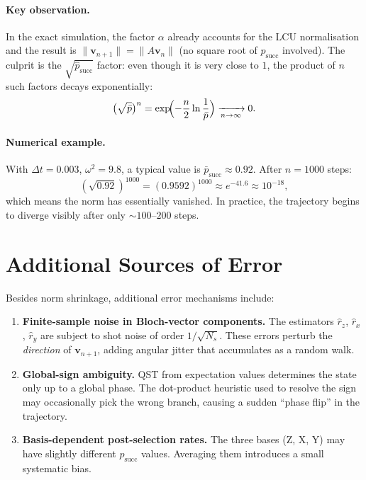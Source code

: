 \documentclass[11pt,a4paper]{article}
\begin{document}
\paragraph{Key observation.}
In the exact simulation, the factor \(\alpha\) already accounts for
the LCU normalisation and the result is
\(\lVert\mathbf v_{n+1}\rVert = \lVert A\mathbf v_n\rVert\)
(no square root of \(p_{\text{succ}}\) involved).
The culprit is the \(\sqrt{\hat p_{\text{succ}}}\) factor: even though it
is very close to \(1\), the product of \(n\) such factors decays
exponentially:
\begin{equation}
  \bigl(\sqrt{\bar p}\bigr)^{n}
  = \exp\!\Bigl(-\frac{n}{2}\ln\frac{1}{\bar p}\Bigr)
  \xrightarrow[n\to\infty]{} 0.
\end{equation}

\paragraph{Numerical example.}
With \(\Delta t=0.003\), \(\omega^2=9.8\), a typical value is
\(\bar p_{\text{succ}} \approx 0.92\).  After \(n=1000\) steps:
\[
  (\sqrt{0.92})^{1000}
  = (0.9592)^{1000}
  \approx e^{-41.6}
  \approx 10^{-18},
\]
which means the norm has essentially vanished.  In practice, the
trajectory begins to diverge visibly after only \(\sim 100\text{--}200\)
steps.

\section{Additional Sources of Error}

Besides norm shrinkage, additional error mechanisms include:

\begin{enumerate}
\item \textbf{Finite-sample noise in Bloch-vector components.}
      The estimators \(\hat r_z\), \(\hat r_x\), \(\hat r_y\) are
      subject to shot noise of order \(1/\sqrt{N_s}\).  These errors
      perturb the \emph{direction} of \(\mathbf v_{n+1}\), adding
      angular jitter that accumulates as a random walk.
\item \textbf{Global-sign ambiguity.}
      QST from expectation values determines the state only up to a
      global phase.  The dot-product heuristic used to resolve the sign
      may occasionally pick the wrong branch, causing a sudden
      ``phase flip'' in the trajectory.
\item \textbf{Basis-dependent post-selection rates.}
      The three bases (Z, X, Y) may have slightly different
      \(p_{\text{succ}}\) values.  Averaging them introduces a small
      systematic bias.
\end{enumerate}
\end{document}
